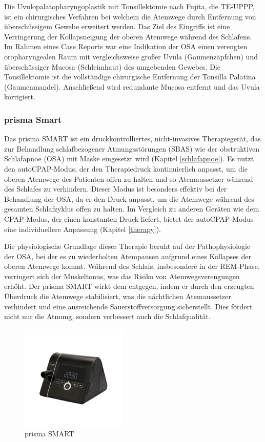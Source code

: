 \documentclass[a4paper, 12pt]{article}
\begin{document}
\begin{itemize}
    Die Uvulopalatopharyngoplastik mit Tonsillektomie nach Fujita, die TE-UPPP, ist ein chirurgisches Verfahren bei welchem die Atemwege durch Entfernung von überschüssigem Gewebe erweitert werden. Das Ziel des Eingriffs ist eine Verringerung der Kollapsneigung der oberen Atemwege während des Schlafens. Im Rahmen eines Case Reports war eine Indikation der OSA einen verengten oropharyngealen Raum mit vergleichsweise großer Uvula (Gaumenzäpfchen) und überschüssiger Mucosa (Schleimhaut) des umgebenden Gewebes. Die Tonsillektomie ist die vollständige chirurgische Entfernung der Tonsilla Palatina (Gaumenmandel). Anschließend wird redundante Mucosa entfernt und das Uvula korrigiert. \cite{Fujita_UPPP}
\end{itemize}

\newpage
\subsubsection{prisma Smart} %
Das prisma SMART ist ein druckkontrolliertes, nicht-invasives Therapiegerät, das zur Behandlung schlafbezogener Atmungsstörungen (SBAS) wie der obstruktiven Schlafapnoe (OSA) mit Maske eingesetzt wird (Kapitel \ref{schlafapnoe}). Es nutzt den autoCPAP-Modus, der den Therapiedruck kontinuierlich anpasst, um die oberen Atemwege des Patienten offen zu halten und so Atemaussetzer während des Schlafes zu verhindern. Dieser Modus ist besonders effektiv bei der Behandlung der OSA, da er den Druck anpasst, um die Atemwege während des gesamten Schlafzyklus offen zu halten. Im Vergleich zu anderen Geräten wie dem CPAP-Modus, der einen konstanten Druck liefert, bietet der autoCPAP-Modus eine individuellere Anpassung (Kapitel \ref{therapy}). 

Die physiologische Grundlage dieser Therapie beruht auf der Pathophysiologie der OSA, bei der es zu wiederholten Atempausen aufgrund eines Kollapses der oberen Atemwege kommt. Während des Schlafs, insbesondere in der REM-Phase, verringert sich der Muskeltonus, was das Risiko von Atemwegsverengungen erhöht. Der prisma SMART wirkt dem entgegen, indem er durch den erzeugten Überdruck die Atemwege stabilisiert, was die nächtlichen Atemaussetzer verhindert und eine ausreichende Sauerstoffversorgung sicherstellt. Dies fördert nicht nur die Atmung, sondern verbessert auch die Schlafqualität.
\cite{manual_smart}

\begin{figure}
	\centering
	\includegraphics[width=0.45\textwidth]{prisma_SMART.jpg}
	\caption{prisma SMART \cite{pic_prisma_smart}}
	\label{pic_prismaSMART}
\end{figure}
\end{document}
